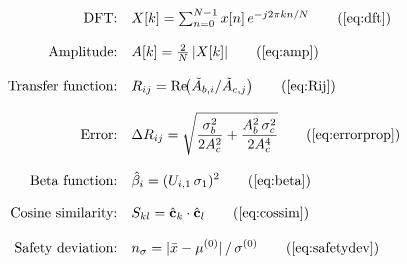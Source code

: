 \documentclass[11pt,a4paper,twoside]{report}
\begin{document}
\begin{align}
  \text{DFT:}\quad
  & X[k] = \textstyle\sum_{n=0}^{N-1} x[n]\,e^{-j2\pi kn/N}
    \tag{\ref{eq:dft}} \\[8pt]
  \text{Amplitude:}\quad
  & A[k] = \tfrac{2}{N}\,|X[k]|
    \tag{\ref{eq:amp}} \\[8pt]
  \text{Transfer function:}\quad
  & R_{ij} = \operatorname{Re}\!\bigl(\tilde{A}_{b,i}/\tilde{A}_{c,j}\bigr)
    \tag{\ref{eq:Rij}} \\[8pt]
  \text{Error:}\quad
  & \Delta R_{ij} = \sqrt{
      \frac{\sigma_b^2}{2A_c^2}
      + \frac{A_b^2\,\sigma_c^2}{2A_c^4}
    }
    \tag{\ref{eq:errorprop}} \\[8pt]
  \text{Beta function:}\quad
  & \hat{\beta}_i = (U_{i,1}\,\sigma_1)^2
    \tag{\ref{eq:beta}} \\[8pt]
  \text{Cosine similarity:}\quad
  & S_{kl} = \hat{\mathbf{c}}_k\cdot\hat{\mathbf{c}}_l
    \tag{\ref{eq:cossim}} \\[8pt]
  \text{Safety deviation:}\quad
  & n_{\sigma} = |\bar{x} - \mu^{(0)}|\,/\,\sigma^{(0)}
    \tag{\ref{eq:safetydev}}
\end{align}


\end{document}
